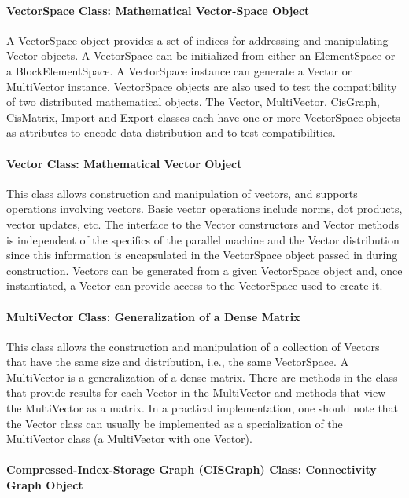 \documentclass[10pt,relax]{PetraObjectModel}
\begin{document}
\paragraph{VectorSpace Class: Mathematical Vector-Space Object}

A VectorSpace object provides a set of indices for addressing and
manipulating Vector objects. A VectorSpace can be initialized from
either an ElementSpace or a BlockElementSpace.  A VectorSpace
instance can generate a Vector or MultiVector instance.  VectorSpace
objects are also used to test the compatibility of two distributed
mathematical objects. The Vector, MultiVector, CisGraph, CisMatrix,
Import and Export classes each have one or more VectorSpace objects
as attributes to encode data distribution and to test
compatibilities.

\paragraph{Vector Class:  Mathematical Vector Object}

This class allows construction and manipulation of vectors, and
supports operations involving vectors.  Basic vector operations
include norms, dot products, vector updates, etc.  The interface to
the Vector constructors and Vector methods is independent of the
specifics of the parallel machine and the Vector distribution since
this information is encapsulated in the VectorSpace object passed in
during construction.  Vectors can be generated from a given
VectorSpace object and, once instantiated, a Vector can provide
access to the VectorSpace used to create it.

\paragraph{MultiVector Class:  Generalization of a Dense Matrix}

This class allows the construction and manipulation of a collection
of Vectors that have the same size and distribution, i.e., the same
VectorSpace. A MultiVector is a generalization of a dense matrix.
There are methods in the class that provide results for each Vector
in the MultiVector and methods that view the MultiVector as a
matrix. In a practical implementation, one should note that the
Vector class can usually be implemented as a specialization of the
MultiVector class (a MultiVector with one Vector).

\paragraph{Compressed-Index-Storage Graph (CISGraph) Class:  Connectivity Graph Object}
\end{document}
